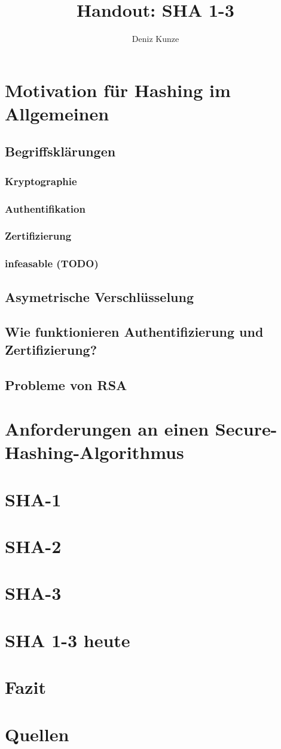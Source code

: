 \documentclass{article}
\title{Handout: SHA 1-3}
\author{Deniz Kunze}
\begin{document}
	\maketitle
	\newpage
	\tableofcontents
	\newpage

	\section{Motivation für Hashing im Allgemeinen}
	\subsection{Begriffsklärungen}
	\subsubsection{Kryptographie}
	\subsubsection{Authentifikation}
	\subsubsection{Zertifizierung}
	\subsubsection{infeasable (TODO)}
	\subsection{Asymetrische Verschlüsselung}
	\subsection{Wie funktionieren Authentifizierung und Zertifizierung?}
	\subsection{Probleme von RSA}
	\section{Anforderungen an einen Secure-Hashing-Algorithmus}
	\section{SHA-1}
	\section{SHA-2}
	\section{SHA-3}
	\section{SHA 1-3 heute}
	\section{Fazit}
	\section{	Quellen}
\end{document}
